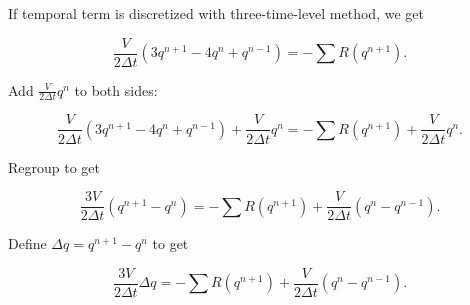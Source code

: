 \documentclass{report}
\begin{document}
If temporal term is discretized with three-time-level method, we get

\begin{equation}\label{eq:original}
    \frac{V}{2\Delta t} (3q^{n+1}-4q^n+q^{n-1}) = -\sum R(q^{n+1}).
\end{equation}

Add $\frac{V}{2\Delta t} q^n$ to both sides:

\begin{equation}
    \frac{V}{2\Delta t} (3q^{n+1}-4q^n+q^{n-1}) + \frac{V}{2\Delta t} q^n = -\sum R(q^{n+1}) + \frac{V}{2\Delta t} q^n.
\end{equation}

Regroup to get 

\begin{equation}
    \frac{3V}{2\Delta t} (q^{n+1}-q^n)  = -\sum R(q^{n+1}) + \frac{V}{2\Delta t} (q^n - q^{n-1}).
\end{equation}

Define $\Delta q = q^{n+1}-q^n$ to get

\begin{equation}
    \frac{3V}{2\Delta t} \Delta q = -\sum R(q^{n+1}) + \frac{V}{2\Delta t} (q^n - q^{n-1}).
\end{equation}
\end{document}
